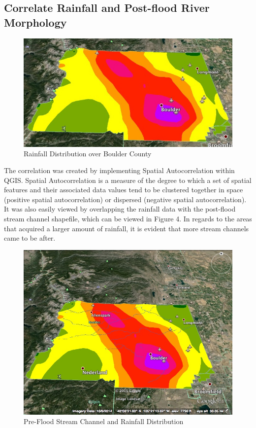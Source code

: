 \documentclass[twoside]{article}
\begin{document}
\begin{multicols}{2}
\subsection{Correlate Rainfall and Post-flood River Morphology}

\begin{figure}[H] %
\includegraphics[width=1\columnwidth]{earth.jpg}
\caption{Rainfall Distribution over Boulder County\label{fig:earth}}
\end{figure} 

The correlation was created by implementing Spatial Autocorrelation within QGIS. Spatial Autocorrelation is a measure of the degree to which a set of spatial features and their associated data values tend to be clustered together in space (positive spatial autocorrelation) or dispersed (negative spatial autocorrelation). \cite{spatial} It was also easily viewed by overlapping the rainfall data with the post-flood stream channel shapefile, which can be viewed in Figure 4. In regards to the areas that acquired a larger amount of rainfall, it is evident that more stream channels came to be after.

\begin{figure}[H] %
\includegraphics[width=1\columnwidth]{preflood.jpg}
\caption{Pre-Flood Stream Channel and Rainfall Distribution\label{fig:preflood}}
\end{figure} 


\end{multicols}
\end{document}
